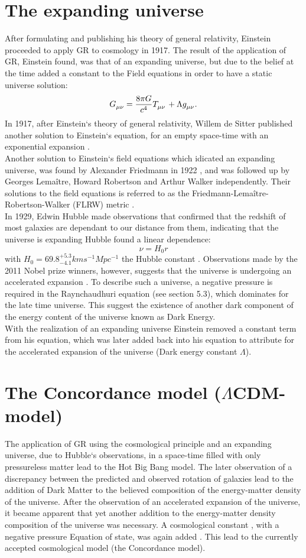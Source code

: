\documentclass[a4paper, 11pt]{FSKH_623_Report}
\numberwithin{equation}{section}
\begin{document}
\section{The expanding universe}
After formulating and publishing his theory of general relativity, Einstein proceeded to apply GR to cosmology in 1917. The result of the application of GR, Einstein found, was that of an expanding universe, but due to the belief at the time added a constant to the Field equations in order to have a static universe solution: $$\tensor{G}{_{\mu\nu}}=\frac{8\pi G}{c^{4}}\tensor{T}{_{\mu\nu}}+\Lambda\tensor{g}{_{\mu\nu}}.$$ In 1917, after Einstein`s theory of general relativity, Willem de Sitter published another solution to Einstein`s equation, for an empty space-time with an exponential expansion \citep{ITC, NPSNe}.\\
Another solution to Einstein`s field equations which idicated an expanding universe, was found by Alexander Friedmann in 1922 \citep{Friedman1922}, and was followed up by Georges Lema\^itre, Howard Robertson and Arthur Walker independently. Their solutions to the field equations is referred to as the Friedmann-Lemaître-Robertson-Walker (FLRW) metric \citep{GRFD}.\\
In 1929, Edwin Hubble made observations that confirmed that the redshift of most galaxies are dependant to our distance from them, indicating that the universe is expanding \citep{GRFD} Hubble found a linear dependence: $$\nu=H_{0}r$$ with $H_{0}=69.8^{+5.3}_{-4.1}km s^{-1}Mpc^{-1}$ the Hubble constant \citep{HPValue}. Observations made by the 2011 Nobel prize winners, however, suggests that the universe is undergoing an accelerated expansion \citep{NPSNe}.
To describe such a universe, a negative pressure is required in the Raynchaudhuri equation (see section 5.3), which dominates for the late time universe. This suggest the existence of another dark component of the energy content of the universe known as Dark Energy.\\
With the realization of an expanding universe Einstein removed a constant term from his equation, which was later added back into his equation to attribute for the accelerated expansion of the universe (Dark energy constant $\Lambda$).
\section{The Concordance model ($\Lambda$CDM-model)}
The application of GR using the cosmological principle and an expanding universe, due to Hubble`s observations, in a space-time filled with only pressureless matter lead to the Hot Big Bang model. The later observation of a discrepancy between the  predicted and observed rotation of galaxies lead to the addition of Dark Matter to the believed composition of the energy-matter density of the universe. After the observation of an accelerated expansion of the universe, it became apparent that yet another addition to the energy-matter density composition of the universe was necessary. A cosmological constant , with a negative pressure Equation of state, was again added \citep{GRFD}. This lead to the currently accepted cosmological model (the Concordance model).
\end{document}
